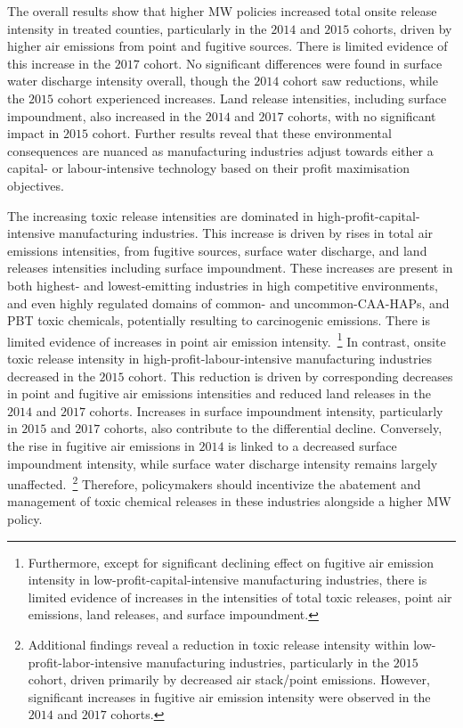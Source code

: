\documentclass[12pt, english]{article}
\begin{document}
    The overall results show that higher MW policies increased total onsite release intensity in treated counties, particularly in the $2014$ and $2015$ cohorts, driven by higher air emissions from point and fugitive sources. There is limited evidence of this increase in the $2017$ cohort. No significant differences were found in surface water discharge intensity overall, though the $2014$ cohort saw reductions, while the $2015$ cohort experienced increases. Land release intensities, including surface impoundment, also increased in the $2014$ and $2017$ cohorts, with no significant impact in $2015$ cohort. Further results reveal that these environmental consequences are nuanced as manufacturing industries adjust towards either a capital- or labour-intensive technology based on their profit maximisation objectives.

    The increasing toxic release intensities are dominated in high-profit-capital-intensive manufacturing industries. This increase is driven by rises in total air emissions intensities, from fugitive sources, surface water discharge, and land releases intensities including surface impoundment. These increases are present in both highest- and lowest-emitting industries in high competitive environments, and even highly regulated domains of common- and uncommon-CAA-HAPs, and PBT toxic chemicals, potentially resulting to carcinogenic emissions. There is limited evidence of increases in point air emission intensity.~\footnote{Furthermore, except for significant declining effect on fugitive air emission intensity in low-profit-capital-intensive manufacturing industries, there is limited evidence of increases in the intensities of total toxic releases, point air emissions, land releases, and surface impoundment.} In contrast, onsite toxic release intensity in high-profit-labour-intensive manufacturing industries decreased in the $2015$ cohort. This reduction is driven by corresponding decreases in point and fugitive air emissions intensities and reduced land releases in the $2014$ and $2017$ cohorts. Increases in surface impoundment intensity, particularly in $2015$ and $2017$ cohorts, also contribute to the differential decline. Conversely, the rise in fugitive air emissions in $2014$ is linked to a decreased surface impoundment intensity, while surface water discharge intensity remains largely unaffected.~\footnote{Additional findings reveal a reduction in toxic release intensity within low-profit-labor-intensive manufacturing industries, particularly in the $2015$ cohort, driven primarily by decreased air stack/point emissions. However, significant increases in fugitive air emission intensity were observed in the $2014$ and $2017$ cohorts.} Therefore, policymakers should incentivize the abatement and management of toxic chemical releases in these industries alongside a higher MW policy.
\end{document}
